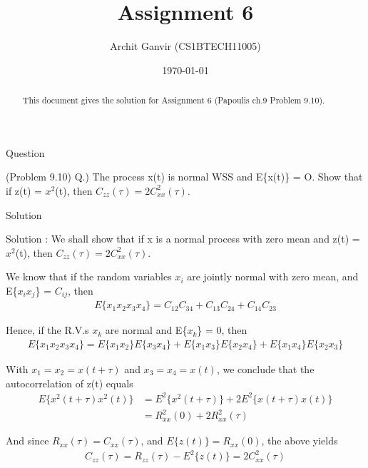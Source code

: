 \documentclass{beamer}
\title{Assignment 6}
\author{Archit Ganvir (CS1BTECH11005)}
\date{\today}
\begin{document}
\providecommand{\brak}[1]{\ensuremath{\left(#1\right)}}
\begin{frame}

\titlepage

\begin{abstract}
This document gives the solution for Assignment 6 (Papoulis ch.9 Problem 9.10).
\end{abstract}

\end{frame}

\logo{}

\begin{frame}{Question}

(Problem 9.10) Q.) The process x(t) is normal WSS and E\{x(t)\} = O. Show that if z(t) = $x^2$(t), then $C_{zz}(\tau) = 2C_{xx}^2(\tau)$.

\end{frame}

\begin{frame}{Solution}

Solution : We shall show that if x is a normal process with zero mean and z(t) = $x^2$(t), then $C_{zz}(\tau) = 2 C_{xx}^2(\tau)$.

We know that if the random variables $x_i$ are jointly normal with zero mean, and E\{$x_i x_j$\} = $C_{ij}$, then
\begin{align}
E\{x_1 x_2 x_3 x_4\} = C_{12} C_{34} + C_{13} C_{24} + C_{14} C_{23}
\end{align}

\end{frame}

\begin{frame}

Hence, if the R.V.s $x_k$ are normal and E\{$x_k$\} = 0, then
\begin{align}
E\{x_1 x_2 x_3 x_4\} = E\{x_1 x_2\} E\{x_3 x_4\} + E\{x_1 x_3\} E\{x_2 x_4\} + E\{x_1 x_4\} E\{x_2 x_3\}
\end{align}

With $x_1 = x_2 = x(t + \tau)$ and $x_3 = x_4 = x(t)$, we conclude that the autocorrelation of z(t) equals
\begin{align}
E\{x^2(t + \tau)x^2(t)\} &= E^2\{x^2(t + \tau)\} + 2 E^2\{x(t + \tau) x(t)\} \\
&= R_{xx}^2 (0) + 2 R_{xx}^2(\tau)
\end{align}

\end{frame}

\begin{frame}

And since $R_{xx}(\tau) = C_{xx}(\tau)$, and $E\{z(t)\} = R_{xx} (0)$, the above yields
\begin{align}
C_{zz}(\tau) = R_{zz}(\tau) - E^2 \{z(t)\} = 2 C_{xx}^2(\tau)
\end{align}

\end{frame}
\end{document}
